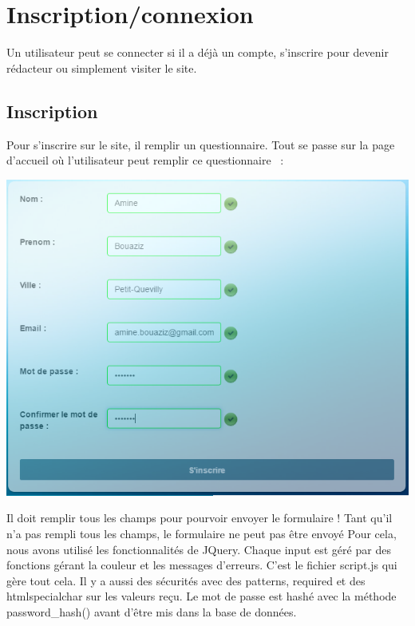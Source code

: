 \documentclass[hidelinks, 12pt,a4paper]{article}
\begin{document}
\newpage
\section{Inscription/connexion}
Un utilisateur peut se connecter si il a déjà un compte, s'inscrire pour devenir rédacteur ou simplement visiter le site.

\subsection{Inscription}
Pour s'inscrire sur le site, il remplir un questionnaire. Tout se passe sur la page d'accueil où l'utilisateur peut remplir ce questionnaire ~:\\

\begin{center}
\includegraphics[scale=0.8]{images/inscriptionvalid.png} 
\end{center}

Il doit remplir tous les champs pour pourvoir envoyer le formulaire ! Tant qu'il n'a pas rempli tous les champs, le formulaire ne peut pas être envoyé Pour cela, nous avons utilisé les fonctionnalités de JQuery. Chaque input est géré par des fonctions gérant la couleur et les messages d'erreurs. C’est le fichier script.js qui gère tout cela. Il y a aussi des sécurités avec des patterns, required et des htmlspecialchar sur les valeurs reçu.
Le mot de passe est hashé avec la méthode password\_hash() avant d'être mis dans la base de données.\\
\end{document}
